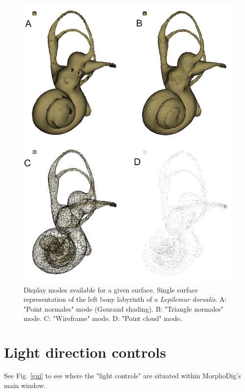 \begin{figure}
  \centering
  \includegraphics[scale=0.4]{images/06/display/4display_modes.png} 
	\caption{Display modes available for a given surface. Single surface representation of the left bony labyrinth of a  \textit{Lepilemur dorsalis}. A: "Point normales" mode (Gouraud shading). B: "Triangle normales" mode. C: "Wireframe" mode. D: "Point cloud" mode.}
\label{4display_modes}
 
\end{figure}


\section{Light direction controls}
See Fig. \ref{gui} to see where the "light controls" are situated within MorphoDig's main window.


